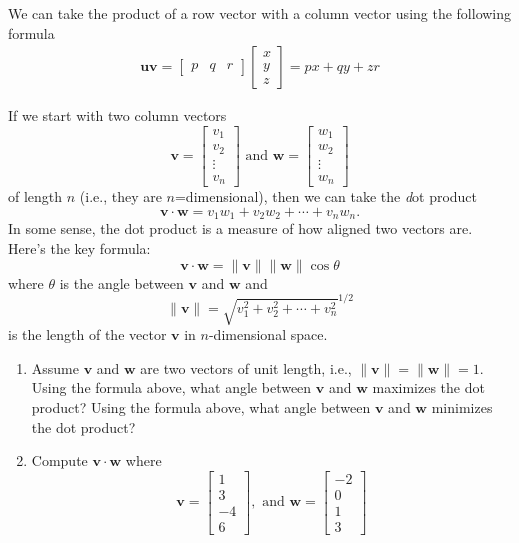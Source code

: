 We can take the product of a row vector with a column vector using the following formula
\begin{align}
\mathbf{u}\mathbf{v} =  \begin{bmatrix} p & q & r \end{bmatrix}\begin{bmatrix}
x \\
y \\
z
\end{bmatrix}  = px + qy + zr
\end{align}

If we start with two column vectors $$\mathbf{v} = \begin{bmatrix} v_1 \\ v_2 \\ \vdots \\ v_n \end{bmatrix} \text{ and } \mathbf{w}=\begin{bmatrix}
w_1 \\ w_2 \\ \vdots \\ w_n
\end{bmatrix}$$ of length $n$ (i.e., they are $n$=dimensional), then we can take the {\textit dot product}
$$\mathbf{v}\cdot \mathbf{w} = v_1w_1 + v_2w_2 + \cdots + v_nw_n.$$
In some sense, the dot product is a measure of how aligned two vectors are. Here's the key formula:
$$\mathbf{v}\cdot\mathbf{w} = \|\mathbf{v}\|\|\mathbf{w}\|\cos\theta$$
where $\theta$ is the angle between $\mathbf{v}$ and $\mathbf{w}$ and 
$$\|\mathbf{v}\|=\sqrt{v_1^2 + v_2^2 + \cdots + v_n^2}^{1/2}$$
is the length of the vector $\mathbf{v}$ in $n$-dimensional space.
\begin{prob}
\begin{enumerate}
    \item Assume $\mathbf{v}$ and $\mathbf{w}$ are two vectors of unit length, i.e., $\|\mathbf{v}\| = \|\mathbf{w}\|=1$. Using the formula above, what angle between $\mathbf{v}$ and $\mathbf{w}$ maximizes the dot product? Using the formula above, what angle between $\mathbf{v}$ and $\mathbf{w}$ minimizes the dot product?
    \item Compute $\mathbf{v}\cdot\mathbf{w}$ where
    $$\mathbf{v} = \begin{bmatrix}
    1 \\ 3 \\ -4 \\ 6
    \end{bmatrix}, \text{ and } \mathbf{w}=\begin{bmatrix}
    -2 \\ 0 \\ 1 \\ 3
    \end{bmatrix}$$
    \end{enumerate}
\end{prob}
